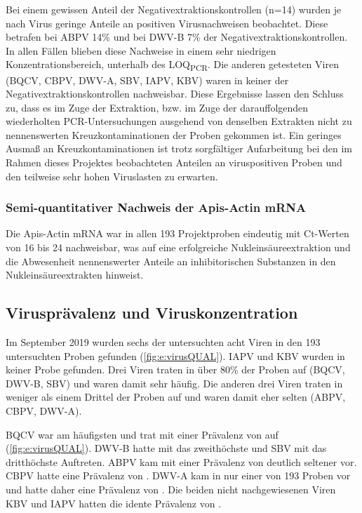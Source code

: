 Bei einem gewissen Anteil der Negativextraktionskontrollen (n=14) wurden je nach Virus geringe Anteile an positiven Virusnachweisen beobachtet. Diese betrafen bei ABPV 14\% und bei DWV-B 7\% der Negativextraktionskontrollen. In allen Fällen blieben diese Nachweise in einem sehr niedrigen Konzentrationsbereich, unterhalb des LOQ\textsubscript{PCR}. Die anderen getesteten Viren (BQCV, CBPV, DWV-A, SBV, IAPV, KBV) waren in keiner der Negativextraktionskontrollen nachweisbar. Diese Ergebnisse lassen den Schluss zu, dass es im Zuge der Extraktion, bzw. im Zuge der darauffolgenden wiederholten PCR-Untersuchungen ausgehend von denselben Extrakten nicht zu nennenswerten Kreuzkontaminationen der Proben gekommen ist. Ein geringes Ausmaß an Kreuzkontaminationen ist trotz sorgfältiger Aufarbeitung bei den im Rahmen dieses Projektes beobachteten Anteilen an viruspositiven Proben und den teilweise sehr hohen Viruslasten zu erwarten.

\subsubsection{Semi-quantitativer Nachweis der Apis-Actin mRNA}

Die Apis-Actin mRNA war in allen 193 Projektproben eindeutig mit Ct-Werten von 16 bis 24 nachweisbar, was auf eine erfolgreiche Nukleinsäureextraktion und die Abwesenheit nennenswerter Anteile an inhibitorischen Substanzen in den Nukleinsäureextrakten hinweist.

\subsection{Virusprävalenz und Viruskonzentration}

Im September 2019 wurden sechs der untersuchten acht Viren in den 193 untersuchten Proben gefunden (\cref{fig:e:virusQUAL}). IAPV und KBV wurden in keiner Probe gefunden. Drei Viren traten in über 80\% der Proben auf (BQCV, DWV-B, SBV) und waren damit sehr häufig. Die anderen drei Viren traten in weniger als einem Drittel der Proben auf und waren damit eher selten (ABPV, CBPV, DWV-A).

BQCV war am häufigsten und trat mit einer Prävalenz von  auf (\cref{fig:e:virusQUAL}). DWV-B hatte mit  das zweithöchste und SBV mit  das dritthöchste Auftreten. ABPV kam mit einer Prävalenz von  deutlich seltener vor. CBPV hatte eine Prävalenz von . DWV-A kam in nur einer von 193 Proben vor und hatte daher eine Prävalenz von . Die beiden nicht nachgewiesenen Viren KBV und IAPV hatten die idente Prävalenz von .

